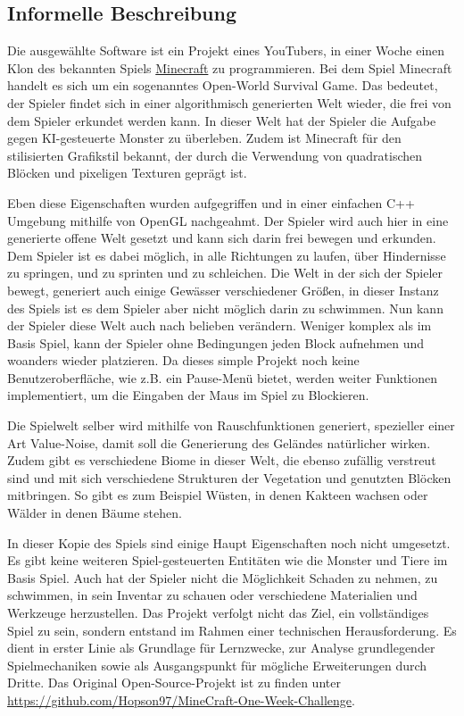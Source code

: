 \documentclass{article}
\begin{document}
\subsection{Informelle Beschreibung} \label{subsec:inf}

Die ausgewählte Software ist ein Projekt eines YouTubers, in einer Woche einen Klon des bekannten Spiels \href{https://www.minecraft.net}{Minecraft} zu programmieren. Bei dem Spiel Minecraft handelt es sich um ein sogenanntes Open-World Survival Game. Das bedeutet, der Spieler findet sich in einer algorithmisch generierten Welt wieder, die frei von dem Spieler erkundet werden kann. In dieser Welt hat der Spieler die Aufgabe gegen KI-gesteuerte Monster zu überleben. Zudem ist Minecraft für den stilisierten Grafikstil bekannt, der durch die Verwendung von quadratischen Blöcken und pixeligen Texturen geprägt ist.

Eben diese Eigenschaften wurden aufgegriffen und in einer einfachen C++ Umgebung mithilfe von OpenGL nachgeahmt. Der Spieler wird auch hier in eine generierte offene Welt gesetzt und kann sich darin frei bewegen und erkunden. Dem Spieler ist es dabei möglich, in alle Richtungen zu laufen, über Hindernisse zu springen, und zu sprinten und zu schleichen. Die Welt in der sich der Spieler bewegt, generiert auch einige Gewässer verschiedener Größen, in dieser Instanz des Spiels ist es dem Spieler aber nicht möglich darin zu schwimmen. Nun kann der Spieler diese Welt auch nach belieben verändern. Weniger komplex als im Basis Spiel, kann der Spieler ohne Bedingungen jeden Block aufnehmen und woanders wieder platzieren. Da dieses simple Projekt noch keine Benutzeroberfläche, wie z.B. ein Pause-Menü bietet, werden weiter Funktionen implementiert, um die Eingaben der Maus im Spiel zu Blockieren.

Die Spielwelt selber wird mithilfe von Rauschfunktionen generiert, spezieller einer Art Value-Noise, damit soll die Generierung des Geländes natürlicher wirken. Zudem gibt es verschiedene Biome in dieser Welt, die ebenso zufällig verstreut sind und mit sich verschiedene Strukturen der Vegetation und genutzten Blöcken mitbringen. So gibt es zum Beispiel Wüsten, in denen Kakteen wachsen oder Wälder in denen Bäume stehen.

In dieser Kopie des Spiels sind einige Haupt Eigenschaften noch nicht umgesetzt. Es gibt keine weiteren Spiel-gesteuerten Entitäten wie die Monster und Tiere im Basis Spiel. Auch hat der Spieler nicht die Möglichkeit Schaden zu nehmen, zu schwimmen, in sein Inventar zu schauen oder verschiedene Materialien und Werkzeuge herzustellen. Das Projekt verfolgt nicht das Ziel, ein vollständiges Spiel zu sein, sondern entstand im Rahmen einer technischen Herausforderung. Es dient in erster Linie als Grundlage für Lernzwecke, zur Analyse grundlegender Spielmechaniken sowie als Ausgangspunkt für mögliche Erweiterungen durch Dritte. Das Original Open-Source-Projekt ist zu finden unter \url{https://github.com/Hopson97/MineCraft-One-Week-Challenge}.
\end{document}
